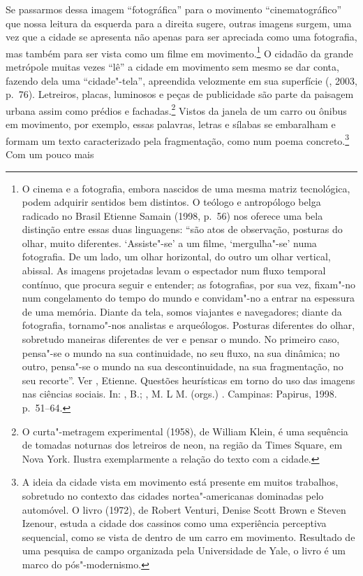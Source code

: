 Se passarmos dessa imagem ``fotográfica'' para o movimento
``cinematográfico'' que nossa leitura da esquerda para a direita sugere,
outras imagens surgem, uma vez que a cidade se apresenta não apenas para
ser apreciada como uma fotografia, mas também para ser vista como um filme em movimento.\footnote{O cinema e a fotografia, embora nascidos de uma mesma matriz tecnológica, podem adquirir sentidos bem distintos. O teólogo e antropólogo belga radicado no Brasil Etienne Samain (1998, p.~56) nos oferece uma bela distinção entre essas duas linguagens: ``são atos de observação, posturas do olhar, muito diferentes. `Assiste"-se' a um filme, `mergulha"-se' numa fotografia. De um lado, um olhar horizontal, do outro um olhar vertical, abissal. As imagens projetadas levam o espectador num fluxo temporal contínuo, que procura seguir e entender; as fotografias, por sua vez, fixam"-no num congelamento do tempo do mundo e convidam"-no a entrar na espessura de uma memória. Diante da tela, somos viajantes e navegadores; diante da fotografia, tornamo"-nos analistas e arqueólogos. Posturas diferentes do olhar, sobretudo maneiras diferentes de ver e pensar o mundo. No primeiro caso, pensa"-se o mundo na sua continuidade, no seu fluxo, na sua dinâmica; no outro, pensa"-se o mundo na sua descontinuidade, na sua fragmentação, no seu recorte''. Ver , Etienne. Questões heurísticas em torno do uso das imagens nas ciências sociais. In: , B.; , M. L M. (orgs.) {}. Campinas: Papirus, 1998. p.~51--64.} O cidadão da grande metrópole
muitas vezes ``lê'' a cidade em movimento sem mesmo se dar conta,
fazendo dela uma ``cidade"-tela'', apreendida velozmente em sua
superfície (, 2003, p.~76). Letreiros, placas, luminosos e peças
de publicidade são parte da paisagem urbana assim como prédios e
fachadas.\footnote{O curta"-metragem experimental {} (1958), de William Klein, é uma sequência de tomadas noturnas
  dos letreiros de neon, na região da Times Square, em Nova York.
  Ilustra exemplarmente a relação do texto com a cidade.} Vistos da janela de um carro ou ônibus em movimento, por
exemplo, essas palavras, letras e sílabas se embaralham e formam um
texto caracterizado pela fragmentação, como num poema
concreto.\footnote{A ideia da cidade vista em movimento está presente em muitos trabalhos, sobretudo no contexto das cidades nortea"-americanas dominadas pelo automóvel. O livro {} (1972), de Robert Venturi, Denise Scott Brown e Steven Izenour, estuda a cidade dos cassinos como uma experiência perceptiva sequencial, como se vista de dentro de um carro em movimento. Resultado de uma pesquisa de campo organizada pela Universidade de Yale, o livro é um marco do pós"-modernismo.} Com um pouco mais
